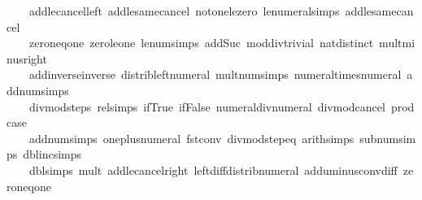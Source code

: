 \begin{isabellebody}
\ \ \ \ add{\isacharunderscore}{\kern0pt}le{\isacharunderscore}{\kern0pt}cancel{\isacharunderscore}{\kern0pt}left\ add{\isacharunderscore}{\kern0pt}le{\isacharunderscore}{\kern0pt}same{\isacharunderscore}{\kern0pt}cancel{}\ not{\isacharunderscore}{\kern0pt}one{\isacharunderscore}{\kern0pt}le{\isacharunderscore}{\kern0pt}zero\ le{\isacharunderscore}{\kern0pt}numeral{\isacharunderscore}{\kern0pt}simps\ add{\isacharunderscore}{\kern0pt}le{\isacharunderscore}{\kern0pt}same{\isacharunderscore}{\kern0pt}cancel{}\isanewline
\ \ \ \ zero{\isacharunderscore}{\kern0pt}neq{\isacharunderscore}{\kern0pt}one\ zero{\isacharunderscore}{\kern0pt}le{\isacharunderscore}{\kern0pt}one\ le{\isacharunderscore}{\kern0pt}num{\isacharunderscore}{\kern0pt}simps\ add{\isacharunderscore}{\kern0pt}Suc\ mod{\isacharunderscore}{\kern0pt}div{\isacharunderscore}{\kern0pt}trivial\ nat{\isachardot}{\kern0pt}distinct\ mult{\isacharunderscore}{\kern0pt}minus{\isacharunderscore}{\kern0pt}right\isanewline
\ \ \ \ add{\isachardot}{\kern0pt}inverse{\isacharunderscore}{\kern0pt}inverse\ distrib{\isacharunderscore}{\kern0pt}left{\isacharunderscore}{\kern0pt}numeral\ mult{\isacharunderscore}{\kern0pt}num{\isacharunderscore}{\kern0pt}simps\ numeral{\isacharunderscore}{\kern0pt}times{\isacharunderscore}{\kern0pt}numeral\ add{\isacharunderscore}{\kern0pt}num{\isacharunderscore}{\kern0pt}simps\isanewline
\ \ \ \ divmod{\isacharunderscore}{\kern0pt}steps\ rel{\isacharunderscore}{\kern0pt}simps\ if{\isacharunderscore}{\kern0pt}True\ if{\isacharunderscore}{\kern0pt}False\ numeral{\isacharunderscore}{\kern0pt}div{\isacharunderscore}{\kern0pt}numeral\ divmod{\isacharunderscore}{\kern0pt}cancel\ prod{\isachardot}{\kern0pt}case\isanewline
\ \ \ \ add{\isacharunderscore}{\kern0pt}num{\isacharunderscore}{\kern0pt}simps\ one{\isacharunderscore}{\kern0pt}plus{\isacharunderscore}{\kern0pt}numeral\ fst{\isacharunderscore}{\kern0pt}conv\ divmod{\isacharunderscore}{\kern0pt}step{\isacharunderscore}{\kern0pt}eq\ arith{\isacharunderscore}{\kern0pt}simps\ sub{\isacharunderscore}{\kern0pt}num{\isacharunderscore}{\kern0pt}simps\ dbl{\isacharunderscore}{\kern0pt}inc{\isacharunderscore}{\kern0pt}simps\isanewline
\ \ \ \ dbl{\isacharunderscore}{\kern0pt}simps\ mult{\isacharunderscore}{\kern0pt}{}\ add{\isacharunderscore}{\kern0pt}le{\isacharunderscore}{\kern0pt}cancel{\isacharunderscore}{\kern0pt}right\ left{\isacharunderscore}{\kern0pt}diff{\isacharunderscore}{\kern0pt}distrib{\isacharunderscore}{\kern0pt}numeral\ add{\isacharunderscore}{\kern0pt}uminus{\isacharunderscore}{\kern0pt}conv{\isacharunderscore}{\kern0pt}diff\ zero{\isacharunderscore}{\kern0pt}neq{\isacharunderscore}{\kern0pt}one\isanewline

\end{isabellebody}
